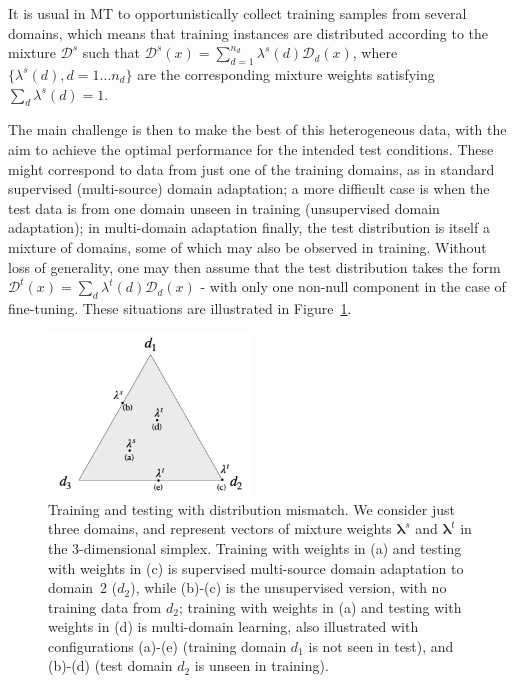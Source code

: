 \documentclass[11pt]{article}
\newcommand{\vlambda}{\ensuremath{\boldsymbol\lambda}\xspace} %
\begin{document}
It is usual in MT to opportunistically collect training samples from several domains, which means that training instances are distributed according to the mixture $\mathcal{D}^s$ such that $\mathcal{D}^s(x) = \sum_{d=1}^{n_d} \lambda^{s}(d) \mathcal{D}_d(x)$, where $\{\lambda^{s}(d), d=1 \dots n_d\}$ are the corresponding mixture weights satisfying $\sum_d \lambda^{s}(d)=1$.

The main challenge is then to make the best of this heterogeneous data, with the aim to achieve the optimal performance for the intended test conditions. These might correspond to data from just one of the training domains, as in standard supervised (multi-source) domain adaptation; a more difficult case is when the test data is from one domain unseen in training (unsupervised domain adaptation); in multi-domain adaptation finally, the test distribution is itself a mixture of domains, some of which may also be observed in training.  Without loss of generality, one may then assume that the test distribution takes the form $\mathcal{D}^{t}(x) = \sum_d \lambda^{t}(d) \mathcal{D}_d(x)$ - with only one non-null  component in the case of fine-tuning.
These situations are illustrated in Figure~\ref{fig:mdmt-lambdas}.
\begin{figure}[h]
  \centering
  \includegraphics[width=0.48\textwidth]{mdmt-lambdas}
  \caption{Training and testing with distribution mismatch. We consider just three domains, and represent vectors of mixture weights $\vlambda^{s}$ and $\vlambda^{t}$ in the 3-dimensional simplex. Training with weights in (a) and testing with weights in (c) is supervised multi-source domain adaptation to domain~2 ($d_2$), while (b)-(c) is the unsupervised version, with no training data from $d_2$; training with weights in (a) and testing with weights in (d) is multi-domain learning, also illustrated with configurations (a)-(e) (training domain $d_1$ is not seen in test), and (b)-(d)  (test domain $d_2$ is unseen in training).}\label{fig:mdmt-lambdas}
\end{figure}
\end{document}
